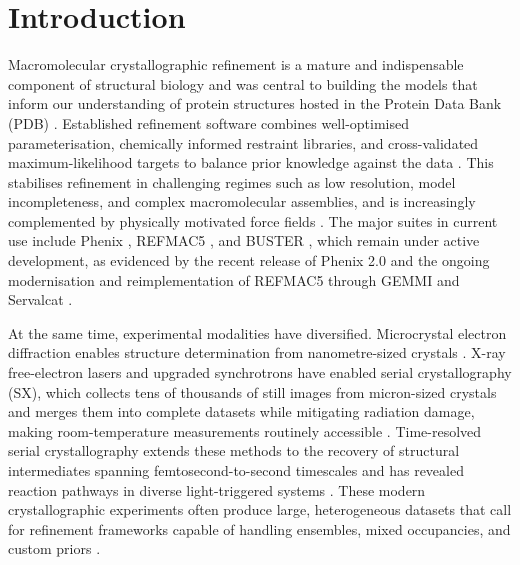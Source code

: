 \documentclass{iucrjournals}
\begin{document}


\section{Introduction}

Macromolecular crystallographic refinement is a mature and indispensable
component of structural biology and was central to building the models that
inform our understanding of protein structures hosted in the Protein Data Bank
(PDB) \cite{burley_rcsb_2019}.
Established refinement software combines well-optimised parameterisation,
chemically informed restraint libraries, and cross-validated maximum-likelihood
targets to balance prior knowledge against the data \cite{pannu_improved_1996,turk_main_2013}.
This stabilises refinement in challenging regimes such as low resolution, model
incompleteness, and complex macromolecular assemblies, and is increasingly
complemented by physically motivated force fields \cite{moriarty_improved_2020}.
The major suites in current use include Phenix \cite{adams_phenix_2010,liebschner_macromolecular_2019},
REFMAC5 \cite{murshudov_refmac5_2011,murshudov_refinement_1997}, and
BUSTER \cite{blanc_refinement_2004}, which remain under active development, as
evidenced by the recent release of Phenix 2.0 and the ongoing
modernisation and reimplementation of REFMAC5 through GEMMI
and Servalcat \cite{yamashita_gemmi_2023}.

At the same time, experimental modalities have diversified.
Microcrystal electron diffraction enables structure determination
from nanometre-sized crystals
\cite{nannenga_cryo-em_2019,clabbers_macromolecular_2021}.
X-ray free-electron lasers and upgraded synchrotrons have enabled serial
crystallography (SX), which collects tens of thousands of still images from
micron-sized crystals and merges them into complete datasets while mitigating
radiation damage, making room-temperature measurements routinely accessible
\cite{schlichting_serial_2015,chapman_x-ray_2019,barends_serial_2022}.
Time-resolved serial crystallography extends these methods to the recovery of
structural intermediates spanning femtosecond-to-second timescales and has
revealed reaction pathways in diverse light-triggered systems
\cite{branden_advances_2021,schulz_best_2022,hekstra_emerging_2023,khusainov_time_2024}.
These modern crystallographic experiments often produce large, heterogeneous
datasets that call for refinement frameworks capable of handling ensembles,
mixed occupancies, and custom priors \cite{henning_hansen_bayesian_2026}.
\end{document}
